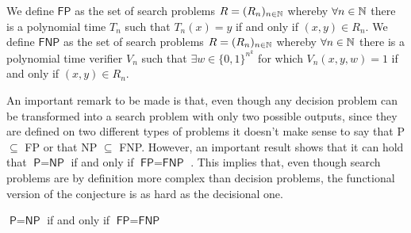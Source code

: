 \newpage

\begin{definition}
 We define $\mathsf{FP}$ as the set of search problems $R = (R_n)_{n \in \mathbb{N}}$ whereby $\forall n \in \mathbb{N}$ there is a polynomial time \TM $T_n$ such that $T_n(x) = y$ if and only if $(x,y) \in R_n$. We define $\mathsf{FNP}$ as the set of search problems $R = (R_n)_{n \in \mathbb{N}}$ whereby $\forall n \in \mathbb{N}$ there is a polynomial time verifier $V_n$ such that $\exists w \in \{0,1\}^{n^k}$ for which $V_n(x,y,w) = 1$ if and only if $(x,y) \in R_n$. 
\end{definition}

An important remark to be made is that, even though any decision problem can be transformed into a search problem with only two possible outputs, since they are defined on two different types of problems it doesn't make sense to say that \textsf{P} $\subseteq$ \textsf{FP} or that \textsf{NP} $\subseteq$ \textsf{FNP}. However, an important result shows that it can hold that $\textsf{P} = \textsf{NP} $ if and only if $\textsf{FP} = \textsf{FNP}$ \cite{decision_vs_search, fp_vs_p}. This implies that, even though search problems are by definition more complex than decision problems, the functional version of the conjecture is as hard as the decisional one.

\begin{theorem}
    $\textsf{P} = \textsf{NP}$ if and only if $\textsf{FP} = \textsf{FNP}$
\end{theorem}

